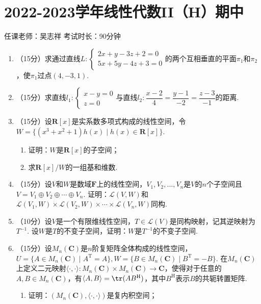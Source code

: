 \section{2022-2023学年线性代数II（H）期中}

\begin{center}
    任课老师：吴志祥\hspace{4em} 考试时长：90分钟
\end{center}

\begin{enumerate}
    \item （15分）求通过直线$L\colon\begin{cases}
        2x+y-3z+2=0 \\ 5x+5y-4z+3=0
    \end{cases}$的两个互相垂直的平面$\pi_1$和$\pi_2$，使$\pi_1$过点$(4,-3,1)$.
	\item （15分）求直线$l_1\colon\begin{cases}
        x-y=0 \\ z=0
    \end{cases}$与直线$l_2\colon\dfrac{x-2}{4}=\dfrac{y-1}{-2}=\dfrac{z-3}{-1}$的距离.
	\item （15分）设$\mathbf{R}[x]$是实系数多项式构成的线性空间，令$W=\{(x^3+x^2+1)h(x)\mid h(x)\in\mathbf{R}[x]\}$.
	\begin{enumerate}
        \item 证明：$W$是$\mathbf{R}[x]$的子空间；

        \item 求$\mathbf{R}[x]/W$的一组基和维数.
    \end{enumerate}
	\item （15分）设$V$和$W$是数域$\mathbf{F}$上的线性空间，$V_1,V_2,\ldots,V_n$是$V$的$n$个子空间且$V=V_1\oplus V_2\oplus\cdots\oplus V_n$. 证明：$\mathcal{L}(V,W)$和$\mathcal{L}(V_1,W)\times\mathcal{L}(V_2,W)\times\cdots\times\mathcal{L}(V_n,W)$同构.
	\item （10分）设$V$是一个有限维线性空间，$T\in\mathcal{L}(V)$是同构映射，记其逆映射为$T^{-1}$. 设$W$是$T$的不变子空间，证明：$W$是$T^{-1}$的不变子空间.
	\item （15分）设$M_n(\mathbf{C})$是$n$阶复矩阵全体构成的线性空间，$U=\{A\in M_n(\mathbf{C})\mid A^{\mathrm{T}}=A\},W=\{B\in M_n(\mathbf{C})\mid B^{\mathrm{T}}=-B\}$. 在$M_n(\mathbf{C})$上定义二元映射$\langle\cdot,\cdot\rangle\colon M_n(\mathbf{C})\times M_n(\mathbf{C})\to\mathbf{C}$，使得对于任意的$A,B\in M_n(\mathbf{C})$，有$\langle A,B\rangle=\tr(AB^{\mathrm{H}})$，其中$B^{\mathrm{H}}$表示$B$的共轭转置矩阵.
	\begin{enumerate}
        \item 证明：$(M_n(\mathbf{C}),\langle\cdot,\cdot\rangle)$是复内积空间；


\end{enumerate}
\end{enumerate}
